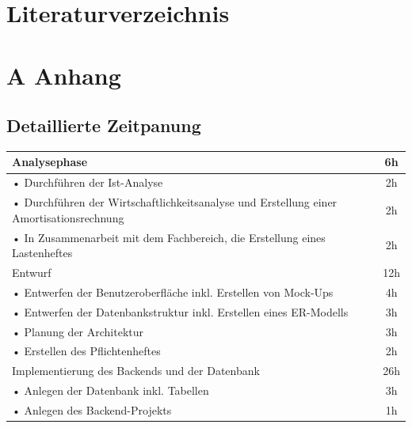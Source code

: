 \documentclass[a4paper,12pt]{article}
\begin{document}
\clearpage
\section*{Literaturverzeichnis}

\clearpage
{}
\appendix
\renewcommand{\thesubsection}{A.\arabic{subsection}}
\section*{A Anhang}
\subsection{Detaillierte Zeitpanung}
\label{sec:detaillierte zeitplanung}
\begin{tabular}{|p{\textwidth}|c|}
    \hline
    \rowcolor{gray}Analysephase & 6h \\
    \hline
    \hspace{0.5cm}• Durchführen der Ist-Analyse &2h \\
    \hline
    \hspace{0.5cm}• Durchführen der Wirtschaftlichkeitsanalyse und Erstellung einer Amortisationsrechnung & 2h \\
    \hline
    \hspace{0.5cm}• In Zusammenarbeit mit dem Fachbereich, die Erstellung eines Lastenheftes  & 2h \\
    \hline
    \rowcolor{gray}Entwurf & 12h \\
    \hline
    \hspace{0.5cm}• Entwerfen der Benutzeroberfläche inkl. Erstellen von Mock-Ups & 4h \\
    \hline
    \hspace{0.5cm}• Entwerfen der Datenbankstruktur inkl. Erstellen eines ER-Modells & 3h \\
    \hline
    \hspace{0.5cm}• Planung der Architektur  & 3h \\
    \hline
    \hspace{0.5cm}• Erstellen des Pflichtenheftes & 2h \\
    \hline
    \rowcolor{gray}Implementierung des Backends und der Datenbank & 26h \\
    \hline
    \hspace{0.5cm}• Anlegen der Datenbank inkl. Tabellen & 3h \\
    \hline
    \hspace{0.5cm}• Anlegen des Backend-Projekts & 1h \\

\end{tabular}
\end{document}
